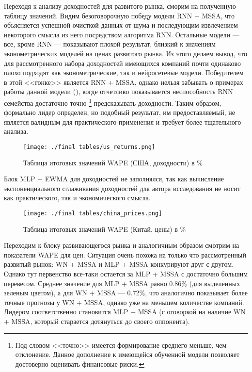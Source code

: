 Переходя к анализу доходностей для развитого рынка, сморим на полученную таблицу значений. Видим безоговорочную победу модели RNN + MSSA, что объясняется успешной очисткой данных от шума и последующим извлечением некоторого смысла из него посредством алгоритма RNN. Остальные модели --- все, кроме RNN --- показывают плохой результат, близкий к значениям эконометрических моделей на ценах развитого рынка. Из этого делаем вывод, что для рассмотренного набора доходностей имеющихся компаний почти одинаково плохо подходят как эконометрические, так и нейросетевые модели. Победителем в этой <<гонке>> является RNN + MSSA, однако нельзя забывать о примерах работы данной модели (), когде отчетливо показывается неспособность RNN семейства достаточно точно \footnote{Под словом <<точно>> имеется формирование среднего меньше, чем отклонение. Данное дополнение к имеющейся обученной модели позволяет достоверно оценивать финансовые риски.} предсказывать доходности. Таким образом, формально лидер определен, но подобный результат, им предоставляемый, не является валидным для практического применения и требует более тщательного анализа.
\begin{figure}[H]
	\centering
	\texttt{[image: ./final tables/us\_returns.png]}
	\caption{Таблица итоговых значений WAPE (США, доходности) в \%}
	\label{pic::final_table_us_returns}
\end{figure}

\noindent Блок MLP + EWMA для доходностей не заполнялся, так как вычисление экспоненциального сглаживания доходностей для автора исследования не носит как практического, так и экономического смысла.

\begin{figure}[H]
	\centering
	\texttt{[image: ./final tables/china\_prices.png]}
	\caption{Таблица итоговых значений WAPE (Китай, цены) в \%}
	\label{pic::final_table_china_prices}
\end{figure}


Переходим к блоку развивающегося рынка и аналогичным образом смотрим на показатели WAPE для цен. Ситуация очень похожа на только что рассмотренный развитый рынок: WN + MSSA и MLP + MSSA конкурируют друг с другом. Однако тут первенство все-таки остается за MLP + MSSA с достаточно большим перевесом. Среднее значение для MLP + MSSA равно $0.86\%$ (для выделенных зеленым цветом), а для WN + MSSA --- $0.72\%$, что аналогично показывает более точные прогнозы у WN + MSSA, однако уже на меньшем количестве компаний. Лидером соответственно становится MLP + MSSA (с оговоркой на наличие WN + MSSA, который старается дотянуться до своего оппонента).

